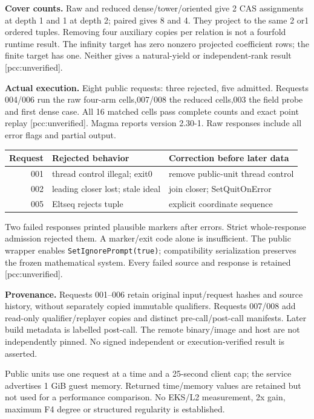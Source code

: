 \documentclass[10pt,a4paper]{article}
\begin{document}
\textbf{Cover counts.} Raw and reduced dense/tower/oriented give 2 CAS
assignments at depth 1 and 1 at depth 2; paired gives 8 and 4. They project to
the same 2 or1 ordered tuples. Removing four auxiliary copies per relation
is not a fourfold runtime result. The infinity target has zero nonzero
projected coefficient rows; the finite target has one. Neither gives a
natural-yield or independent-rank result [pcc:unverified].

\newpage
\textbf{Actual execution.} Eight public requests: three rejected, five
admitted. Requests 004/006 run the raw four-arm cells,007/008 the reduced
cells,003 the field probe and first dense case. All 16 matched cells pass
complete counts and exact point replay [pcc:unverified]. Magma reports
version 2.30-1. Raw responses include all error flags and partial output.

\begin{center}
\begin{tabular}{rll}
\toprule
Request & Rejected behavior & Correction before later data\\\midrule
001 & thread control illegal; exit0 & remove public-unit thread control\\
002 & leading closer lost; stale ideal & join closer; SetQuitOnError\\
005 & Eltseq rejects tuple & explicit coordinate sequence\\\bottomrule
\end{tabular}
\end{center}
Two failed responses printed plausible markers after errors. Strict
whole-response admission rejected them. A marker/exit code alone is
insufficient. The public wrapper enables \texttt{SetIgnorePrompt(true)};
compatibility serialization preserves the frozen mathematical system.
Every failed source and response is retained [pcc:unverified].

\textbf{Provenance.} Requests 001--006 retain original input/request hashes
and source history, without separately copied immutable qualifiers.
Requests 007/008 add read-only qualifier/replayer copies and distinct
pre-call/post-call manifests. Later build metadata is labelled post-call.
The remote binary/image and host are not independently pinned. No signed
independent or execution-verified result is asserted.

Public units use one request at a time and a 25-second client cap; the
service advertises 1 GiB guest memory. Returned time/memory values are
retained but not used for a performance comparison. No EKS/L2 measurement,
2x gain, maximum F4 degree or structured regularity is established.
\end{document}
